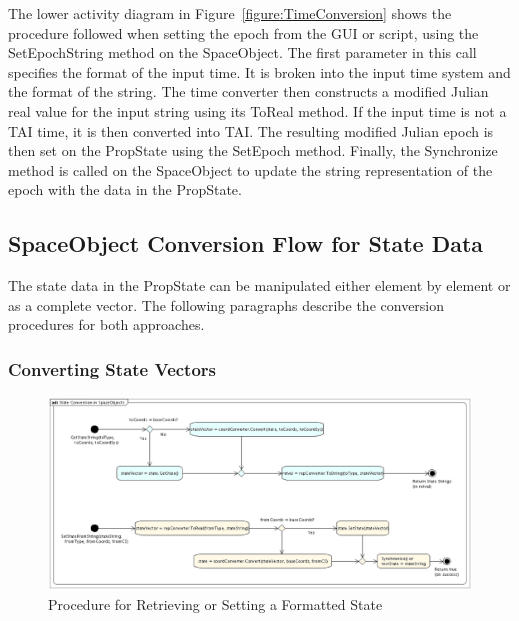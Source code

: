 The lower activity diagram in Figure~\ref{figure:TimeConversion} shows the procedure followed when
setting the epoch from the GUI or script, using the SetEpochString method on the SpaceObject.  The
first parameter in this call specifies the format of the input time.  It is broken into the input
time system and the format of the string.  The time converter then constructs a modified Julian
real value for the input string using its ToReal method.  If the input time is not a TAI time, it
is then converted into TAI.  The resulting modified Julian epoch is then set on the PropState using
the SetEpoch method.  Finally, the Synchronize method is called on the SpaceObject to update the
string representation of the epoch with the data in the PropState.

\subsection{SpaceObject Conversion Flow for State Data}

The state data in the PropState can be manipulated either element by element or as a complete
vector.  The following paragraphs describe the conversion procedures for both approaches.

\subsubsection{Converting State Vectors}

\begin{figure}[htb]
\begin{center}
\includegraphics[scale=0.35]{Images/StateConversioninSpaceObjects.eps}
\caption{\label{figure:StateConversion}Procedure for Retrieving or Setting a Formatted State}
\end{center}
\end{figure}


